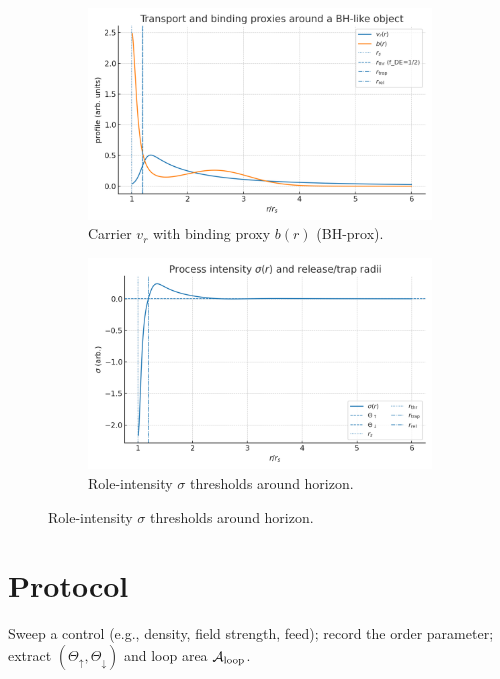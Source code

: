 \documentclass[12pt,a4paper,oneside]{scrreprt}
\begin{document}
\begin{figure}[htbp]\centering
  \begin{subfigure}[t]{0.49\linewidth}
    \includegraphics[width=\linewidth]{bh_profiles_vr_b.png}
    \caption{Carrier $v_r$ with binding proxy $b(r)$ (BH-prox).}
    \label{fig:bh:profiles}
  \end{subfigure}\hfill
  \begin{subfigure}[t]{0.49\linewidth}
    \includegraphics[width=\linewidth]{bh_sigma_thresholds.png}
    \caption{Role-intensity $\sigma$ thresholds around horizon.}
    \label{fig:bh:sigma}
  \end{subfigure}
\end{figure}

\section*{Protocol}
Sweep a control (e.g., density, field strength, feed); record the order parameter; extract $(\Theta_\uparrow,\Theta_\downarrow)$ and loop area $\mathcal A_{\rm loop}$.
\end{document}
